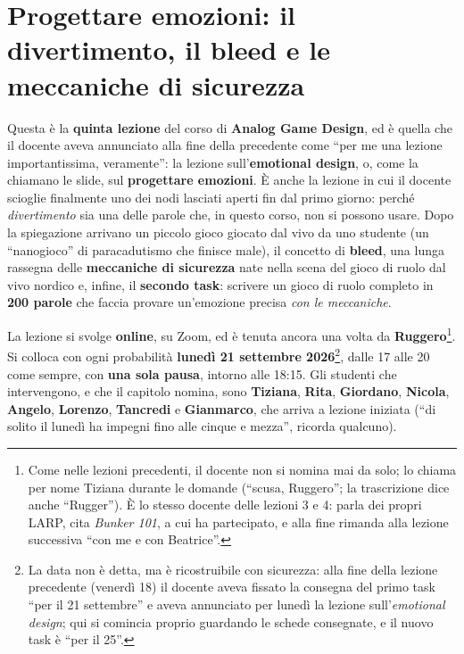 \chapter[Progettare emozioni]{Progettare emozioni: il divertimento, il bleed
e le meccaniche di sicurezza}
\label{a5:cap:emozioni}

Questa è la \textbf{quinta lezione} del corso di \textbf{Analog Game Design}, ed
è quella che il docente aveva annunciato alla fine della precedente come ``per me
una lezione importantissima, veramente'': la lezione sull'\textbf{emotional
design}, o, come la chiamano le slide, sul \textbf{progettare emozioni}. È anche
la lezione in cui il docente scioglie finalmente uno dei nodi lasciati aperti fin
dal primo giorno: perché \emph{divertimento} sia una delle parole che, in questo
corso, non si possono usare. Dopo la spiegazione arrivano un piccolo gioco giocato
dal vivo da uno studente (un ``nanogioco'' di paracadutismo che finisce male), il
concetto di \textbf{bleed}, una lunga rassegna delle \textbf{meccaniche di
sicurezza} nate nella scena del gioco di ruolo dal vivo nordico e, infine, il
\textbf{secondo task}: scrivere un gioco di ruolo completo in \textbf{200 parole}
che faccia provare un'emozione precisa \emph{con le meccaniche}.

La lezione si svolge \textbf{online}, su Zoom, ed è tenuta ancora una volta da
\textbf{Ruggero}\footnote{Come nelle lezioni precedenti, il docente non si nomina
mai da solo; lo chiama per nome Tiziana durante le domande (``scusa, Ruggero'';
la trascrizione dice anche ``Rugger''). È lo stesso docente delle lezioni 3 e 4:
parla dei propri LARP, cita \emph{Bunker 101}, a cui ha partecipato, e alla fine
rimanda alla lezione successiva ``con me e con Beatrice''.}. Si colloca con ogni
probabilità \textbf{lunedì 21 settembre 2026}\footnote{La data non è detta, ma è
ricostruibile con sicurezza: alla fine della lezione precedente (venerdì 18) il
docente aveva fissato la consegna del primo task ``per il 21 settembre'' e aveva
annunciato per lunedì la lezione sull'\emph{emotional design}; qui si comincia
proprio guardando le schede consegnate, e il nuovo task è ``per il 25''.}, dalle
17 alle 20 come sempre, con \textbf{una sola pausa}, intorno alle 18:15. Gli
studenti che intervengono, e che il capitolo nomina, sono \textbf{Tiziana},
\textbf{Rita}, \textbf{Giordano}, \textbf{Nicola}, \textbf{Angelo},
\textbf{Lorenzo}, \textbf{Tancredi} e \textbf{Gianmarco}, che arriva a lezione
iniziata (``di solito il lunedì ha impegni fino alle cinque e mezza'', ricorda
qualcuno).

